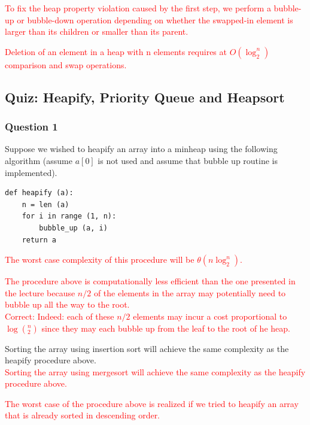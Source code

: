 \documentclass{article}
\begin{document}
\textcolor{red}{To fix the heap property violation caused by the first step, we perform a bubble-up or bubble-down operation depending on whether the swapped-in element is larger than its children or smaller than its parent.\\}

\textcolor{red}{Deletion of an element in a heap with n elements requires at $O(\log_2^n)$ comparison and swap operations.\\}


\subsection{Quiz: Heapify, Priority Queue and Heapsort}


\subsubsection{Question 1}

Suppose we wished to heapify  an array into a minheap using the following algorithm (assume $a[0]$ is not used and assume that bubble up routine is implemented).\\

\begin{verbatim}
def heapify (a):
    n = len (a)
    for i in range (1, n):
        bubble_up (a, i)
    return a
\end{verbatim}

\textcolor{red}{The worst case complexity of this procedure will be $\theta(n\log_2^n)$.\\}

\textcolor{red}{The procedure above is computationally less efficient than the one presented in the lecture because $n/2$ of the elements in the array may potentially need to bubble up all the way to the root.\\
Correct: Indeed: each of these $n/2$ elements may incur a cost proportional to $\log(_2^n)$ since they may each bubble up from the leaf to the root of he heap.\\}

Sorting the array using insertion sort will achieve the same complexity as the heapify procedure above. \\

\textcolor{red}{Sorting the array using mergesort will achieve the same complexity as the heapify procedure above.\\}

\textcolor{red}{The worst case of the procedure above is realized if we tried to heapify an array that is already sorted in descending order.\\}
\end{document}
